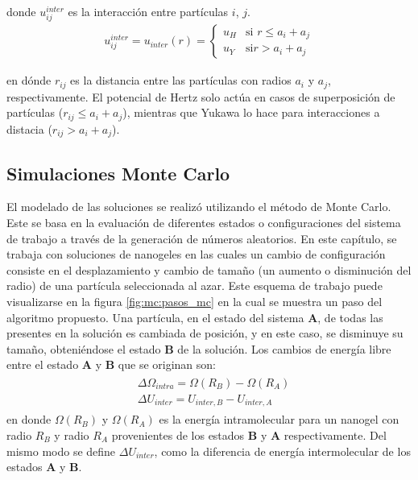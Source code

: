 	\noindent donde $u_{ij}^{inter}$ es la interacci\'on entre part\'iculas $i$, $j$.
	\begin{align}
	u_{ij}^{inter}	= u_{inter}(r) = \begin{cases} u_H  & \text{si } r \leq a_i + a_j \\ u_Y & \text{si} r > a_i + a_j \end{cases} 
		\label{eq:mc:HY-potential}
	\end{align}
	
	\noindent en d\'onde $r_{ij}$ es la distancia entre las part\'iculas con radios $a_i$ y $a_j$, respectivamente.
	El potencial de Hertz solo act\'ua en casos de superposici\'on de part\'iculas ($r_{ij} \leq a_i +a_j$), mientras que Yukawa lo hace para interacciones a distacia ($r_{ij} > a_i + a_j$).
	

	
	
	\subsection{Simulaciones Monte Carlo} \label{sec:mc:mc}
	
	El modelado de las soluciones se realiz\'o utilizando el m\'etodo de Monte Carlo. Este se basa en la evaluaci\'on de diferentes estados o configuraciones del sistema de trabajo a trav\'es de la generaci\'on de n\'umeros aleatorios. En este cap\'itulo, se trabaja con soluciones de nanogeles en las cuales un cambio de configuraci\'on consiste en el desplazamiento y cambio de tama\~no (un aumento o disminuci\'on  del radio) de una part\'icula seleccionada al azar. Este esquema de trabajo puede visualizarse en la figura \ref{fig:mc:pasos_mc} en la cual se muestra un paso del algoritmo propuesto. Una part\'icula, en el estado del sistema \textbf{A}, de todas las presentes en la soluci\'on es cambiada de posici\'on, y en este caso, se disminuye su tama\~no, obteni\'endose el estado \textbf{B} de la soluci\'on.
	Los cambios de energ\'ia libre entre el estado \textbf{A} y \textbf{B} que se originan son:
		\begin{align}
		\begin{aligned}
			& \Delta \Omega_{intra} = \Omega(R_B) - \Omega(R_A) \\
			& \Delta U_{inter} = U_{inter,B} - U_{inter,A}
		\end{aligned}
	\end{align}
	\noindent en donde $\Omega(R_B)$ y $\Omega(R_A)$ es la energ\'ia intramolecular para un nanogel con radio $R_B$ y radio $R_A$ provenientes de los estados \textbf{B} y \textbf{A} respectivamente. Del mismo modo se define $\Delta U_{inter}$, como la diferencia de energ\'ia intermolecular de los estados \textbf{A} y \textbf{B}.
	
